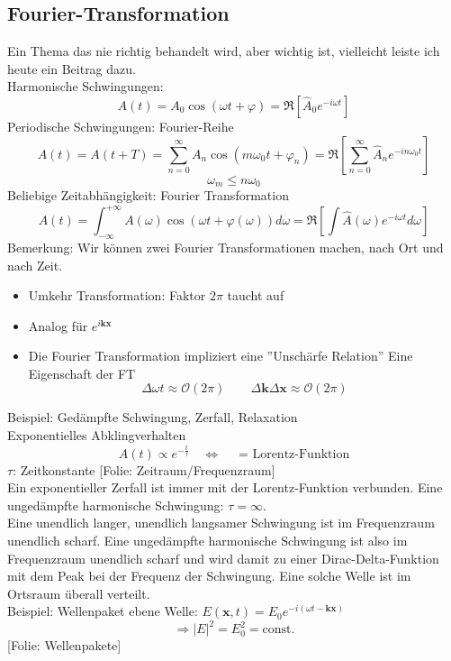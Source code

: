 \documentclass[titlepage,11pt,a4paper,ngerman]{report}
\newcommand{\tx}[1]{\textrm{#1}}
\newcommand{\const}{\tx{const.}}
\newcommand{\folie}[1]{\color{gray}[Folie: #1]\color{black}}
\newcommand{\summ}[2]{\sum_{#1}^{#2}}
\newcommand{\intt}[2]{\int_{#1}^{#2}}
\renewcommand{\vec}[1]{\boldsymbol{#1}}
\newcommand{\lcom}[1]{\color{MidnightBlue}#1\color{black}}
\begin{document}
\subsection{Fourier-Transformation}
\lcom{Ein Thema das nie richtig behandelt wird, aber wichtig ist, vielleicht leiste ich heute ein Beitrag dazu.}\\
Harmonische Schwingungen:
$$A(t) = A_0 \cos (\omega t + \varphi) = \Re [\hat A_0 e^{-i\omega t}]$$
Periodische Schwingungen: Fourier-Reihe
$$A(t) = A(t + T) = \summ{n = 0}{\infty} A_n \cos(m \omega_0 t + \varphi_n) = \Re \left[\summ{n = 0}{\infty} \hat A_n e^{-i n \omega_0 t}\right]$$
$$\omega_m \leq n \omega_0$$
Beliebige Zeitabhängigkeit: Fourier Transformation
$$A(t) = \intt{-\infty}{+\infty} A(\omega) \cos (\omega t + \varphi(\omega)) d \omega = \Re [\int \hat A (\omega) e^{-i\omega t} d \omega]$$
Bemerkung: \lcom{Wir können zwei Fourier Transformationen machen, nach Ort und nach Zeit.}
\begin{itemize}
	\item Umkehr Transformation: Faktor $2 \pi$ taucht auf
	\item Analog für $e^{i \vec{k} \vec{x}}$
	\item Die Fourier Transformation impliziert eine ''Unschärfe Relation'' \lcom{Eine Eigenschaft der FT}
		$$\Delta \omega t \approx \mathcal O(2 \pi) \qquad \Delta \vec{k} \Delta \vec{x} \approx \mathcal O(2\pi)$$
\end{itemize}
Beispiel: Gedämpfte Schwingung, Zerfall, Relaxation\\
Exponentielles Abklingverhalten
$$A(t) \propto e^{-\frac{t}{\tau}} \quad \Leftrightarrow \quad \textrm{ = Lorentz-Funktion}$$
$\tau$: Zeitkonstante
\folie{Zeitraum/Frequenzraum}\\
\lcom{Ein exponentieller Zerfall ist immer mit der Lorentz-Funktion verbunden. Eine ungedämpfte harmonische Schwingung: $\tau = \infty$. }\\
\lcom{Eine unendlich langer, unendlich langsamer Schwingung ist im Frequenzraum unendlich scharf. Eine ungedämpfte harmonische Schwingung ist also im Frequenzraum unendlich scharf und wird damit zu einer Dirac-Delta-Funktion mit dem Peak bei der Frequenz der Schwingung. Eine solche Welle ist im Ortsraum überall verteilt.}\\
Beispiel: Wellenpaket
ebene Welle: $E(\vec{x},t) = E_0 e^{-i(\omega t - \vec{k} \vec{x})}$
$$\Rightarrow |E|^2 = E_0^2 = \const$$
\folie{Wellenpakete}\\


\end{document}
